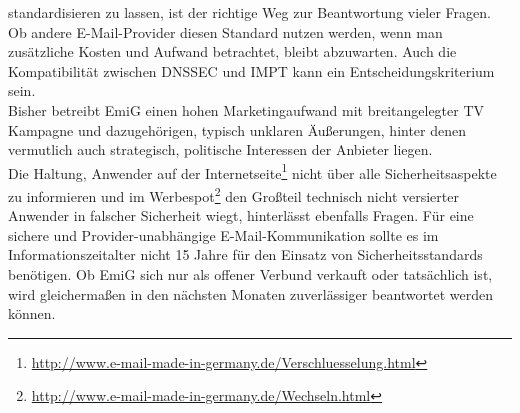 \documentclass  [paper=a4,
				fontsize=12pt,
				listof=totoc,
				bibliography=totoc
				]{scrreprt}
\begin{document}
			standardisieren zu lassen, ist der richtige Weg zur Beantwortung vieler Fragen.
			Ob andere E-Mail-Provider diesen Standard nutzen werden, wenn man zusätzliche Kosten und Aufwand betrachtet, bleibt abzuwarten. Auch die Kompatibilität zwischen \ac{DNSSEC} und \ac{IMPT} kann ein Entscheidungskriterium sein.
			\medskip\\
			Bisher betreibt \ac{EmiG} einen hohen Marketingaufwand mit breitangelegter TV Kampagne und dazugehörigen, typisch unklaren Äußerungen, hinter denen vermutlich auch strategisch, politische Interessen der Anbieter liegen.\\
			Die Haltung, Anwender auf der Internetseite\footnote{\url{http://www.e-mail-made-in-germany.de/Verschluesselung.html}} 
			nicht über alle Sicherheitsaspekte zu informieren und im Werbespot\footnote{\url{http://www.e-mail-made-in-germany.de/Wechseln.html}} den Großteil technisch nicht versierter Anwender in falscher Sicherheit wiegt, hinterlässt ebenfalls Fragen.
			Für eine sichere und Provider-unabhängige E-Mail-Kommunikation sollte es im Informationszeitalter nicht 15 Jahre für den Einsatz von Sicherheitsstandards benötigen.
			Ob \ac{EmiG} sich nur als offener Verbund verkauft oder tatsächlich ist, wird gleichermaßen in den nächsten Monaten zuverlässiger beantwortet werden können.
			
%			
				
\end{document}
